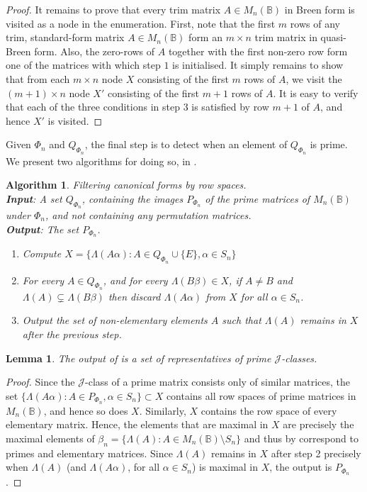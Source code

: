 \documentclass[11pt]{article}
\newtheorem{lemma}[thm]{Lemma}
\newtheorem{algo}[thm]{Algorithm}
\newenvironment{alg}{\begin{algo}\rm}{\end{algo}}
\numberwithin{equation}{section}
\newcommand{\set}[2]{\ensuremath{\{#1 : #2 \}}}
\newcommand{\B}{\mathbb{B}}
\newcommand{\Bn}{M_n(\B)}
\newcommand{\J}{\mathscr{J}}
\newcommand{\RowS}{\Lambda}
\begin{document}
\begin{proof}
  It remains to prove that every trim matrix $A \in \Bn$ in Breen form is
  visited as a node in the enumeration. First, note that the first $m$ rows of
  any trim, standard-form matrix $A \in \Bn$ form an $m \times n$ trim matrix in
  quasi-Breen form. Also, the zero-rows of $A$ together with the first
  non-zero row form one of the matrices with which step $1$ is initialised. It
  simply remains to show that from each $m \times n$ node $X$ consisting of the
  first $m$ rows of $A$, we visit the $(m + 1)\times n$ node $X'$ consisting of
  the first $m + 1$ rows of $A$. It is easy to verify that each of the three
  conditions in step $3$ is satisfied by row $m + 1$ of $A$, and hence $X'$ is
  visited.
\end{proof}

Given $\Phi_n$ and $Q_{\Phi_n}$, the final step is to detect when an element of
$Q_{\Phi_n}$ is prime. We present two algorithms for doing so, in
.

\begin{alg}
  Filtering canonical forms by row spaces.\\
  \textbf{Input}: A set $Q_{\Phi_n}$, containing the images $P_{\Phi_n}$ of the
  prime matrices of $\Bn$ under $\Phi_n$, and not containing any permutation
  matrices. \\
  \textbf{Output}: The set $P_{\Phi_n}$.
  \begin{enumerate}
  \item 
    Compute $X = \set{\RowS(A\alpha)}{A \in Q_{\Phi_n} \cup \{E\}, \alpha \in
      S_n}$
  \item
    For every $A \in Q_{\Phi_n}$, and for every $\RowS(B\beta) \in X$, if $A
    \neq B$ and $\RowS(A) \subsetneq \RowS(B\beta)$ then discard
    $\RowS(A\alpha)$ from $X$ for all $\alpha \in S_n$.
  \item
    Output the set of non-elementary elements $A$ such that $\RowS(A)$ remains
    in $X$ after the previous step.
  \end{enumerate}
\end{alg}

\begin{lemma}
  The output of  is a set of representatives of prime
  $\J$-classes.
\end{lemma}
\begin{proof}
  Since the $\J$-class of a prime matrix consists only of similar matrices, the
  set $\set{\RowS(A\alpha)}{A \in P_{\Phi_n}, \alpha \in S_n} \subset X$
  contains all row spaces of prime matrices in $\Bn$, and hence so does $X$.
  Similarly, $X$ contains the row space of every elementary matrix. Hence, the
  elements that are maximal in $X$ are precisely the maximal elements of
  $\beta_n = \set{\RowS(A)}{A\in \Bn\setminus S_n}$ and thus by
   correspond to primes and elementary matrices.
  Since $\RowS(A)$ remains in $X$ after step 2 precisely when $\RowS(A)$ (and
  $\RowS(A\alpha)$, for all $\alpha \in S_n$) is maximal in $X$, the output is
  $P_{\Phi_n}$.
\end{proof} 
\end{document}
